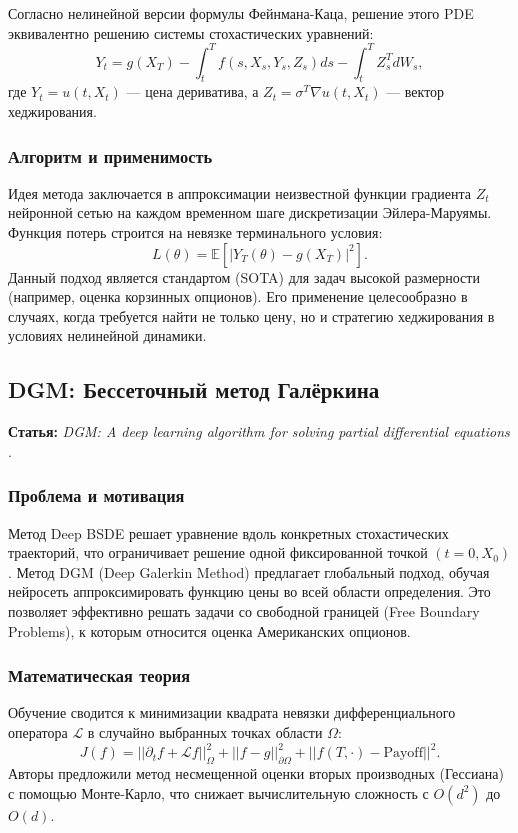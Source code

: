 Согласно нелинейной версии формулы Фейнмана-Каца, решение этого PDE эквивалентно решению системы стохастических уравнений:
\begin{equation}
    Y_t = g(X_T) - \int_{t}^{T} f(s, X_s, Y_s, Z_s) ds - \int_{t}^{T} Z_s^T dW_s,
\end{equation}
где $Y_t = u(t, X_t)$ — цена дериватива, а $Z_t = \sigma^T \nabla u(t, X_t)$ — вектор хеджирования.

\subsubsection{Алгоритм и применимость}
Идея метода заключается в аппроксимации неизвестной функции градиента $Z_t$ нейронной сетью на каждом временном шаге дискретизации Эйлера-Маруямы. Функция потерь строится на невязке терминального условия:
\begin{equation}
    L(\theta) = \mathbb{E} \left[ | Y_T(\theta) - g(X_T) |^2 \right].
\end{equation}
Данный подход является стандартом (SOTA) для задач высокой размерности (например, оценка корзинных опционов). Его применение целесообразно в случаях, когда требуется найти не только цену, но и стратегию хеджирования в условиях нелинейной динамики.

\subsection{DGM: Бессеточный метод Галёркина}
\textbf{Статья:} \textit{DGM: A deep learning algorithm for solving partial differential equations} \cite{Sirignano2018}.

\subsubsection{Проблема и мотивация}
Метод Deep BSDE решает уравнение вдоль конкретных стохастических траекторий, что ограничивает решение одной фиксированной точкой $(t=0, X_0)$. Метод DGM (Deep Galerkin Method) предлагает глобальный подход, обучая нейросеть аппроксимировать функцию цены во всей области определения. Это позволяет эффективно решать задачи со свободной границей (Free Boundary Problems), к которым относится оценка Американских опционов.

\subsubsection{Математическая теория}
Обучение сводится к минимизации квадрата невязки дифференциального оператора $\mathcal{L}$ в случайно выбранных точках области $\Omega$:
\begin{equation}
    J(f) = || \partial_t f + \mathcal{L}f ||^2_{\Omega} + ||f - g||^2_{\partial \Omega} + ||f(T, \cdot) - \text{Payoff}||^2.
\end{equation}
Авторы предложили метод несмещенной оценки вторых производных (Гессиана) с помощью Монте-Карло, что снижает вычислительную сложность с $O(d^2)$ до $O(d)$.

